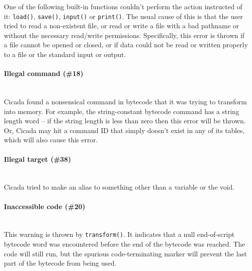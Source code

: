 \documentclass{article}
\begin{document}
One of the following built-in functions couldn't perform the action instructed of it:  \verb#load()#, \verb#save()#, \verb#input()# or \verb#print()#.  The usual cause of this is that the user tried to read a non-existent file, or read or write a file with a bad pathname or without the necessary read/write permissions.  Specifically, this error is thrown if a file cannot be opened or closed, or if data could not be read or written properly to a file or the standard input or output.\\




\paragraph{Illegal command (\#18)\\\\}

Cicada found a nonsensical command in bytecode that it was trying to transform into memory.  For example, the string-constant bytecode command has a string length word -- if the string length is less than zero then this error will be thrown.  Or, Cicada may hit a command ID that simply doesn't exist in any of its tables, which will also cause this error.\\




\paragraph{Illegal target (\#38)\\\\}

Cicada tried to make an alias to something other than a variable or the void.\\




\paragraph{Inaccessible code (\#20)\\\\}

This warning is thrown by \verb#transform()#.  It indicates that a null end-of-script bytecode word was encountered before the end of the bytecode was reached.  The code will still run, but the spurious code-terminating marker will prevent the last part of the bytecode from being used.\\
\end{document}
